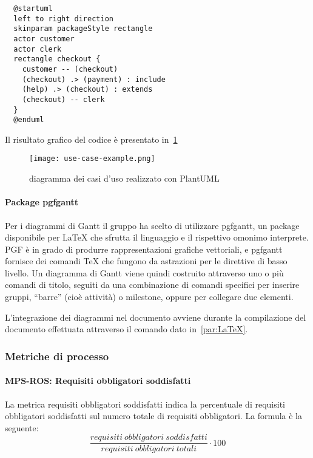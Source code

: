 \documentclass[../../norme-di-progetto.tex]{subfiles}
\begin{document}
\begin{verbatim}
  @startuml
  left to right direction
  skinparam packageStyle rectangle
  actor customer
  actor clerk
  rectangle checkout {
    customer -- (checkout)
    (checkout) .> (payment) : include
    (help) .> (checkout) : extends
    (checkout) -- clerk
  }
  @enduml
\end{verbatim}

Il risultato grafico del codice è presentato in~\ref{fig:esempio_caso_duso}

\begin{figure}[H]%
  \label{fig:esempio_caso_duso}
  \texttt{[image: use-case-example.png]}
  \centering
  \caption{diagramma dei casi d'uso realizzato con PlantUML}
\end{figure}


\paragraph{Package pgfgantt}%
\label{par:pgfgantt}

Per i diagrammi di Gantt il gruppo ha scelto di utilizzare pgfgantt, un package disponibile per \LaTeX{} che sfrutta il linguaggio  e il rispettivo omonimo interprete.
PGF è in grado di produrre rappresentazioni grafiche vettoriali, e pgfgantt fornisce dei comandi \TeX{} che fungono da astrazioni per le direttive di basso livello.
Un diagramma di Gantt viene quindi costruito attraverso uno o più comandi di titolo, seguiti da una combinazione di comandi specifici per inserire gruppi, ``barre'' (cioè attività) o milestone, oppure per collegare due elementi.

L'integrazione dei diagrammi nel documento avviene durante la compilazione del documento effettuata attraverso il comando dato in~\ref{par:LaTeX}.


\subsubsection{Metriche di processo}%
\label{subs:sviluppo/metriche_di_processo}

\paragraph{MPS-ROS: Requisiti obbligatori soddisfatti}%
\label{par:MPS-ROS_requisiti_obbligatori_soddisfatti}

La metrica requisiti obbligatori soddisfatti indica la percentuale di requisiti obbligatori soddisfatti sul numero totale di requisiti obbligatori. La formula è la seguente:
\[
  \frac{requisiti\ obbligatori\ soddisfatti}{requisiti\ obbligatori\ totali}\cdot 100
\]
\end{document}
